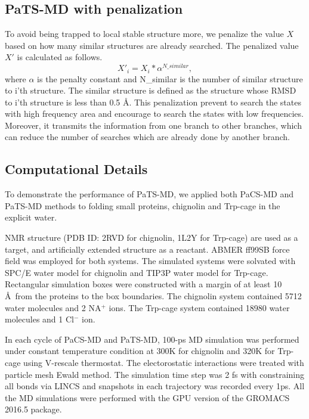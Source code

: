 \subsection{PaTS-MD with penalization}
To avoid being trapped to local stable structure more, we penalize the value $X$ based on how many similar structures are already searched.
The penalized value $X'$ is calculated as follows.
\begin{equation}
X'_i = X_i * \alpha^{N\_similar}, 
\end{equation}
where $\alpha$ is the penalty constant and N\_similar is the number of similar structure to i'th structure. The similar structure is defined as the structure whose RMSD to i'th structure is less than 0.5 \AA.
This penalization prevent to search the states with high frequency area and encourage to search the states with low frequencies. Moreover, it transmits the information from one branch to other branches, which can reduce the number of searches which are already done by another branch.

\subsection{Computational Details}

To demonstrate the performance of PaTS-MD, we applied both PaCS-MD and PaTS-MD methods to folding small proteins, chignolin and Trp-cage in the explicit water.

NMR structure (PDB ID: 2RVD for chignolin, 1L2Y for Trp-cage) are used as a target, and artificially extended structure as a reactant.
ABMER ff99SB force field was employed for both systems. The simulated systems were solvated with SPC/E water model for chignolin and TIP3P water model for Trp-cage. Rectangular simulation boxes were constructed with a margin of at least 10  \AA \  from the proteins to the box boundaries.
The chignolin system contained 5712 water molecules and 2 NA$^+$ ions. The Trp-cage system contained 18980 water molecules and 1 Cl$^-$ ion.

In each cycle of PaCS-MD and PaTS-MD, 100-ps MD simulation was performed under constant temperature condition at 300K for chignolin and 320K for Trp-cage using V-rescale thermostat. The electorostatic interactions were treated with particle mesh Ewald method. The simulation time step was 2 fs with constraining all bonds via LINCS and snapshots in each trajectory was recorded every 1ps. All the MD simulations were performed with the GPU version of the GROMACS 2016.5 package. 

